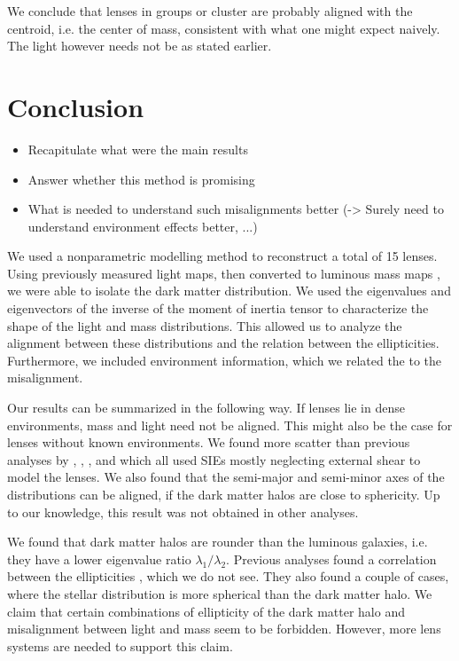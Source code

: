 \documentclass[useAMS,usenatbib]{mn2e}
\begin{document}
We conclude that lenses in groups or cluster are probably aligned with the centroid, i.e. the center of mass, consistent with what one might expect naively. The light however needs not be as stated earlier.



\section{Conclusion}\label{sec:conclusion}
\begin{itemize}
\item Recapitulate what were the main results
\item Answer whether this method is promising
\item What is needed to understand such misalignments better (-> Surely need to understand environment effects better, ...)
\end{itemize}

We used a nonparametric modelling method to reconstruct a total of 15 lenses. Using previously measured light maps, then converted to luminous mass maps \cite{leier11phd}, we were able to isolate the dark matter distribution. We used the eigenvalues and eigenvectors of the inverse of the moment of inertia tensor to characterize the shape of the light and mass distributions. This allowed us to analyze the alignment between these distributions and the relation between the ellipticities. Furthermore, we included environment information, which we related the to the misalignment.

Our results can be summarized in the following way. If lenses lie in dense environments, mass and light need not be aligned. This might also be the case for lenses without known environments. We found more scatter than previous analyses by \cite{1997ApJ...482..604K}, \cite{2006ApJ...649..599K}, \cite{2009ApJ...690..670T}, and \cite{2012ApJ...761..170G} which all used SIEs mostly neglecting external shear to model the lenses. We also found that the semi-major and semi-minor axes of the distributions can be aligned, if the dark matter halos are close to sphericity. Up to our knowledge, this result was not obtained in other analyses.

We found that dark matter halos are rounder than the luminous galaxies, i.e. they have a lower eigenvalue ratio $\lambda_{1}/\lambda_{2}$. Previous analyses found a correlation between the ellipticities \citep{2009ApJ...690..670T,2012ApJ...761..170G}, which we do not see. They also found a couple of cases, where the stellar distribution is more spherical than the dark matter halo. We claim that certain combinations of ellipticity of the dark matter halo and misalignment between light and mass seem to be forbidden. However, more lens systems are needed to support this claim.
\end{document}
